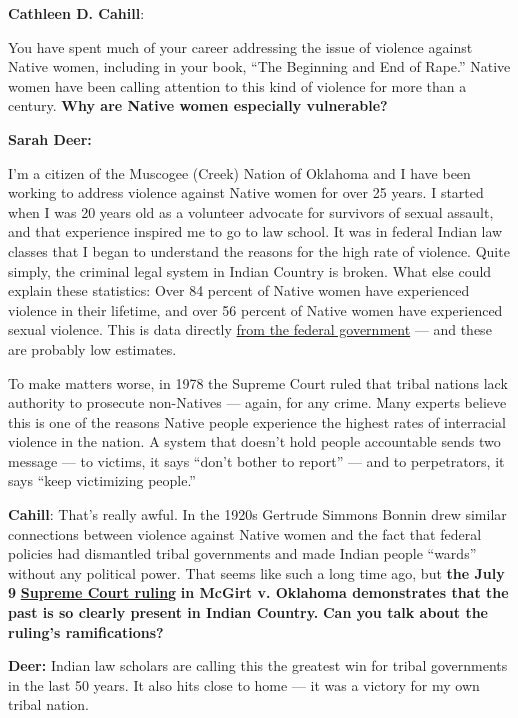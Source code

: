 \textbf{Cathleen D. Cahill}:

You have spent much of your career addressing the issue of violence
against Native women, including in your book, ``The Beginning and End of
Rape.'' Native women have been calling attention to this kind of
violence for more than a century. \textbf{Why are Native women
especially vulnerable?}

\textbf{Sarah Deer:}

I'm a citizen of the Muscogee (Creek) Nation of Oklahoma and I have been
working to address violence against Native women for over 25 years. I
started when I was 20 years old as a volunteer advocate for survivors of
sexual assault, and that experience inspired me to go to law school. It
was in federal Indian law classes that I began to understand the reasons
for the high rate of violence. Quite simply, the criminal legal system
in Indian Country is broken. What else could explain these statistics:
Over 84 percent of Native women have experienced violence in their
lifetime, and over 56 percent of Native women have experienced sexual
violence. This is data directly
\href{https://nij.ojp.gov/topics/articles/violence-against-american-indian-and-alaska-native-women-and-men}{from
the federal government} --- and these are probably low estimates.

To make matters worse, in 1978 the Supreme Court ruled that tribal
nations lack authority to prosecute non-Natives --- again, for any
crime. Many experts believe this is one of the reasons Native people
experience the highest rates of interracial violence in the nation. A
system that doesn't hold people accountable sends two message --- to
victims, it says ``don't bother to report'' --- and to perpetrators, it
says ``keep victimizing people.''

\textbf{Cahill}: That's really awful. In the 1920s Gertrude Simmons
Bonnin drew similar connections between violence against Native women
and the fact that federal policies had dismantled tribal governments and
made Indian people ``wards'' without any political power. That seems
like such a long time ago, but \textbf{the July 9}
\textbf{\href{https://www.nytimes.com/2020/07/09/us/supreme-court-oklahoma-mcgirt-creek-nation.html}{Supreme
Court ruling}} \textbf{in McGirt v. Oklahoma demonstrates that the past
is so clearly present in Indian Country.} \textbf{Can you talk about the
ruling's ramifications?}

\textbf{Deer:} Indian law scholars are calling this the greatest win for
tribal governments in the last 50 years. It also hits close to home ---
it was a victory for my own tribal nation.

